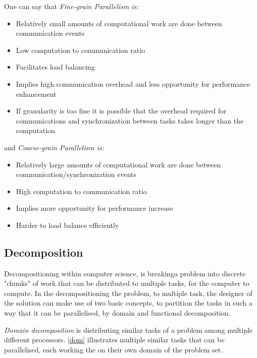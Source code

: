One can say that \emph{Fine-grain Parallelism is:}
\begin{itemize}
  \item Relatively small amounts of computational work are done between communication events

  \item Low computation to communication ratio

  \item Facilitates load balancing

  \item Implies high communication overhead and less opportunity for performance enhancement

  \item If granularity is too fine it is possible that the overhead required for communications and synchronization between tasks takes longer than the computation.
\end{itemize}
and \emph{Coarse-grain Parallelism is:}
\begin{itemize}
  \item Relatively large amounts of computational work are done between communication/synchronization events

  \item High computation to communication ratio

  \item Implies more opportunity for performance increase

  \item Harder to load balance efficiently
\end{itemize}

\subsection{Decomposition}
  Decompositioning within computer science, is breakinga problem into discrete "chunks" of work that can be distributed to multiple tasks, for the computer to compute.
  In the decompositioning the problem, to multiple task, the designer of the solution can make use of two basic concepts, to partition the tasks in such a way that it can be parallelised, by domain and functional decomposition.

  \emph{Domain decomposition} is distributing similar tasks of a problem among multiple different processors. \cref{dom} illustrates multiple similar tasks that can be parallelised, each working the on their own domain of the problem set.

